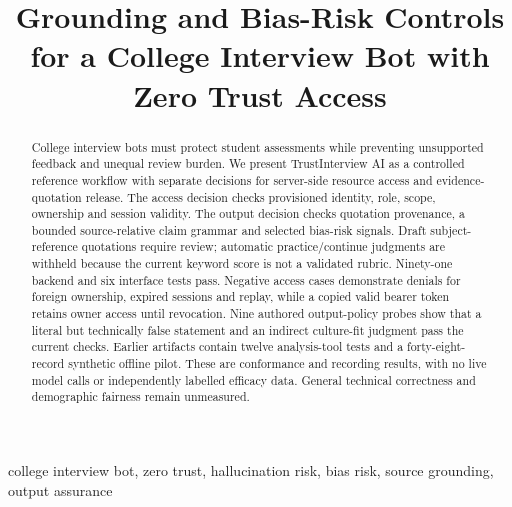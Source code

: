 \documentclass[conference]{IEEEtran}
\begin{document}
\title{Grounding and Bias-Risk Controls for a College Interview Bot with Zero Trust Access}

\author{%
\and
{}
\and
{}
\and
{}
}


\maketitle

\begin{abstract}
College interview bots must protect student assessments while preventing unsupported feedback and unequal review burden. We present TrustInterview AI as a controlled reference workflow with separate decisions for server-side resource access and evidence-quotation release. The access decision checks provisioned identity, role, scope, ownership and session validity. The output decision checks quotation provenance, a bounded source-relative claim grammar and selected bias-risk signals. Draft subject-reference quotations require review; automatic practice/continue judgments are withheld because the current keyword score is not a validated rubric. Ninety-one backend and six interface tests pass. Negative access cases demonstrate denials for foreign ownership, expired sessions and replay, while a copied valid bearer token retains owner access until revocation. Nine authored output-policy probes show that a literal but technically false statement and an indirect culture-fit judgment pass the current checks. Earlier artifacts contain twelve analysis-tool tests and a forty-eight-record synthetic offline pilot. These are conformance and recording results, with no live model calls or independently labelled efficacy data. General technical correctness and demographic fairness remain unmeasured.
\end{abstract}
\begin{IEEEkeywords}
college interview bot, zero trust, hallucination risk, bias risk, source grounding, output assurance
\end{IEEEkeywords}
\end{document}
